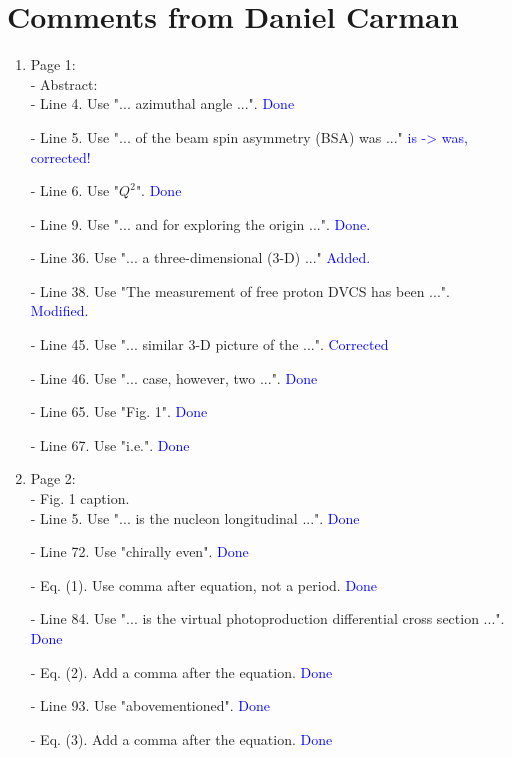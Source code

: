 \documentclass[a4paper,11pt,twoside]{article}
\date{\today}
\begin{document}
\section{Comments from Daniel Carman}

\begin{enumerate}

\item Page 1:\\
 - Abstract:\\
   - Line 4. Use "... azimuthal angle ...".
   \textcolor{blue}{Done} 

   - Line 5. Use "... of the beam spin asymmetry (BSA) was ..."
   \textcolor{blue}{is -> was, corrected!}

   - Line 6. Use "$Q^2$".
   \textcolor{blue}{Done}

   - Line 9. Use "... and for exploring the origin ...".
   \textcolor{blue}{Done.}

 - Line 36. Use "... a three-dimensional (3-D) ..."
   \textcolor{blue}{Added.}

 - Line 38. Use "The measurement of free proton DVCS has been ...".
   \textcolor{blue}{Modified.}

 - Line 45. Use "... similar 3-D picture of the ...".
   \textcolor{blue}{Corrected}

 - Line 46. Use "... case, however, two ...".
   \textcolor{blue}{Done}

 - Line 65. Use "Fig. 1".
   \textcolor{blue}{Done}

 - Line 67. Use "i.e.".
   \textcolor{blue}{Done}
~\\
\item Page 2:\\
 - Fig. 1 caption.\\
   - Line 5. Use "... is the nucleon longitudinal ...".
   \textcolor{blue}{Done}

 - Line 72. Use "chirally even".
   \textcolor{blue}{Done}

 - Eq. (1). Use comma after equation, not a period.
   \textcolor{blue}{Done}

 - Line 84. Use "... is the virtual photoproduction differential cross section 
      ...".
   \textcolor{blue}{Done}

 - Eq. (2). Add a comma after the equation.
   \textcolor{blue}{Done}
 
 - Line 93. Use "abovementioned".
   \textcolor{blue}{Done}
 
 - Eq. (3). Add a comma after the equation.
   \textcolor{blue}{Done}
 

\end{enumerate}
\end{document}
